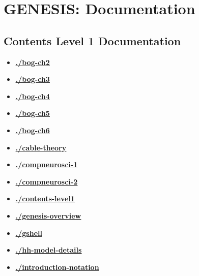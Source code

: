 \documentclass[12pt]{article}
\begin{document}
\section*{GENESIS: Documentation}

\subsection*{Contents Level 1 Documentation}

\begin{itemize}

\item \href{.././bog-ch2/./bog-ch2.pdf}{\bf \underline{./bog-ch2}}

\item \href{.././bog-ch3/./bog-ch3.pdf}{\bf \underline{./bog-ch3}}

\item \href{.././bog-ch4/./bog-ch4.pdf}{\bf \underline{./bog-ch4}}

\item \href{.././bog-ch5/./bog-ch5.pdf}{\bf \underline{./bog-ch5}}

\item \href{.././bog-ch6/./bog-ch6.pdf}{\bf \underline{./bog-ch6}}

\item \href{.././cable-theory/./cable-theory.pdf}{\bf \underline{./cable-theory}}

\item \href{.././compneurosci-1/./compneurosci-1.pdf}{\bf \underline{./compneurosci-1}}

\item \href{.././compneurosci-2/./compneurosci-2.pdf}{\bf \underline{./compneurosci-2}}

\item \href{.././contents-level1/./contents-level1.pdf}{\bf \underline{./contents-level1}}

\item \href{.././genesis-overview/./genesis-overview.pdf}{\bf \underline{./genesis-overview}}

\item \href{.././gshell/./gshell.pdf}{\bf \underline{./gshell}}

\item \href{.././hh-model-details/./hh-model-details.pdf}{\bf \underline{./hh-model-details}}

\item \href{.././introduction-notation/./introduction-notation.pdf}{\bf \underline{./introduction-notation}}


\end{itemize}
\end{document}
